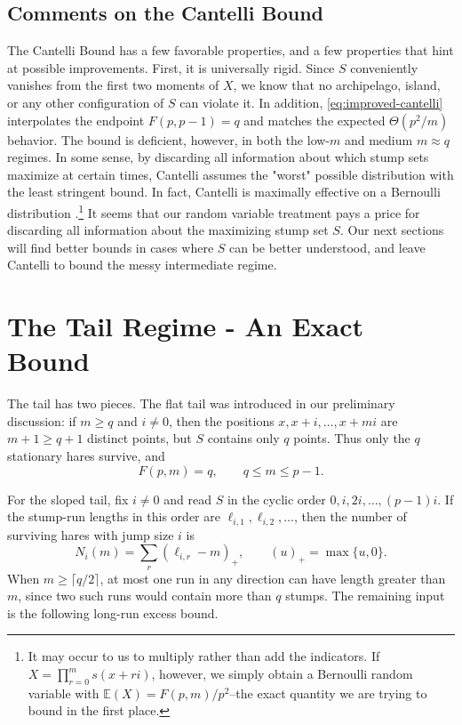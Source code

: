 \documentclass{article}
\begin{document}
\subsection{Comments on the Cantelli Bound}

The Cantelli Bound has a few favorable properties, and a few properties that hint at possible improvements. First, it is universally rigid. Since $S$ conveniently vanishes from the first two moments of $X$, we know that no archipelago, island, or any other configuration of $S$ can violate it. 
In addition, \eqref{eq:improved-cantelli} interpolates the endpoint $F(p,p-1)=q$ and matches the expected $\Theta(p^2/m)$ behavior. The bound is deficient, however, in both the low-$m$ and medium $m\approx q$ regimes. In some sense, by discarding all information about which stump sets maximize at certain times, Cantelli assumes the "worst" possible distribution with the least stringent bound. In fact, Cantelli is maximally effective on a Bernoulli distribution \cite{feller1968}.\footnote{It may occur to us to multiply rather than add the indicators. If $X=\prod_{r=0}^{m}s(x+ri)$, however, we simply obtain a Bernoulli random variable with $\mathbb{E}(X)=F(p,m)/p^2$--the exact quantity we are trying to bound in the first place.} It seems that our random variable treatment pays a price for discarding all information about the maximizing stump set $S$. Our next sections will find better bounds in cases where $S$ can be better understood, and leave Cantelli to bound the messy intermediate regime.
\section{The Tail Regime - An Exact Bound}

The tail has two pieces. The flat tail was introduced in our preliminary discussion: if $m\geq q$ and
$i\neq0$, then the positions $x,x+i,\ldots,x+mi$ are $m+1\geq q+1$
distinct points, but $S$ contains only $q$ points. Thus only the $q$
stationary hares survive, and
\begin{equation}
F(p,m)=q,\qquad q\leq m\leq p-1.
\label{eq:flat-tail}
\end{equation}

For the sloped tail, fix $i\neq0$ and read $S$ in the cyclic order
$0,i,2i,\ldots,(p-1)i$. If the stump-run lengths in this order are
$\ell_{i,1},\ell_{i,2},\ldots$, then the number of surviving hares with
jump size $i$ is
\begin{equation}
N_i(m)=\sum_r(\ell_{i,r}-m)_+,
\qquad (u)_+=\max\{u,0\}.
\label{eq:run-count}
\end{equation}
When $m\geq\lceil q/2\rceil$, at most one run in any direction can have
length greater than $m$, since two such runs would contain more than $q$
stumps. The remaining input is the following long-run excess bound.
\end{document}
